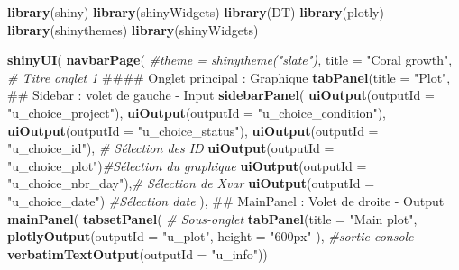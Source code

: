 \documentclass[]{report}
\newenvironment{Shaded}{\begin{snugshade}}{\end{snugshade}}
\newcommand{\KeywordTok}[1]{\textcolor[rgb]{0.13,0.29,0.53}{\textbf{#1}}}
\newcommand{\DataTypeTok}[1]{\textcolor[rgb]{0.13,0.29,0.53}{#1}}
\newcommand{\StringTok}[1]{\textcolor[rgb]{0.31,0.60,0.02}{#1}}
\newcommand{\CommentTok}[1]{\textcolor[rgb]{0.56,0.35,0.01}{\textit{#1}}}
\newcommand{\NormalTok}[1]{#1}
\begin{document}
\begin{Shaded}
\begin{Highlighting}[]
\KeywordTok{library}\NormalTok{(shiny)}
\KeywordTok{library}\NormalTok{(shinyWidgets)}
\KeywordTok{library}\NormalTok{(DT)}
\KeywordTok{library}\NormalTok{(plotly)}
\KeywordTok{library}\NormalTok{(shinythemes)}
\KeywordTok{library}\NormalTok{(shinyWidgets)}


\KeywordTok{shinyUI}\NormalTok{(}
  \KeywordTok{navbarPage}\NormalTok{(}
    \CommentTok{#theme = shinytheme("slate"),}
    \DataTypeTok{title =} \StringTok{"Coral growth"}\NormalTok{, }\CommentTok{# Titre onglet 1}
\NormalTok{    #### Onglet principal : Graphique}
    \KeywordTok{tabPanel}\NormalTok{(}\DataTypeTok{title =} \StringTok{"Plot"}\NormalTok{,}
\NormalTok{             ## Sidebar : volet de gauche - Input}
             \KeywordTok{sidebarPanel}\NormalTok{(}
               \KeywordTok{uiOutput}\NormalTok{(}\DataTypeTok{outputId =} \StringTok{"u_choice_project"}\NormalTok{),}
               \KeywordTok{uiOutput}\NormalTok{(}\DataTypeTok{outputId =} \StringTok{"u_choice_condition"}\NormalTok{),}
               \KeywordTok{uiOutput}\NormalTok{(}\DataTypeTok{outputId =} \StringTok{"u_choice_status"}\NormalTok{),}
               \KeywordTok{uiOutput}\NormalTok{(}\DataTypeTok{outputId =} \StringTok{"u_choice_id"}\NormalTok{), }\CommentTok{# Sélection des ID}
               \KeywordTok{uiOutput}\NormalTok{(}\DataTypeTok{outputId =} \StringTok{"u_choice_plot"}\NormalTok{)}\CommentTok{#Sélection du graphique}
               \KeywordTok{uiOutput}\NormalTok{(}\DataTypeTok{outputId =} \StringTok{"u_choice_nbr_day"}\NormalTok{),}\CommentTok{# Sélection de Xvar}
               \KeywordTok{uiOutput}\NormalTok{(}\DataTypeTok{outputId =} \StringTok{"u_choice_date"}\NormalTok{)       }\CommentTok{#Sélection date}
\NormalTok{             ),}
\NormalTok{             ## MainPanel : Volet de droite - Output}
             \KeywordTok{mainPanel}\NormalTok{(}
               \KeywordTok{tabsetPanel}\NormalTok{(}
                 \CommentTok{# Sous-onglet}
                 \KeywordTok{tabPanel}\NormalTok{(}\DataTypeTok{title =} \StringTok{"Main plot"}\NormalTok{,}
                          \KeywordTok{plotlyOutput}\NormalTok{(}\DataTypeTok{outputId =} \StringTok{"u_plot"}\NormalTok{, }
                                       \DataTypeTok{height =} \StringTok{"600px"}\NormalTok{ ),}
                          \CommentTok{#sortie console}
                          \KeywordTok{verbatimTextOutput}\NormalTok{(}\DataTypeTok{outputId =} \StringTok{"u_info"}\NormalTok{))}

\end{Highlighting}
\end{Shaded}
\end{document}
